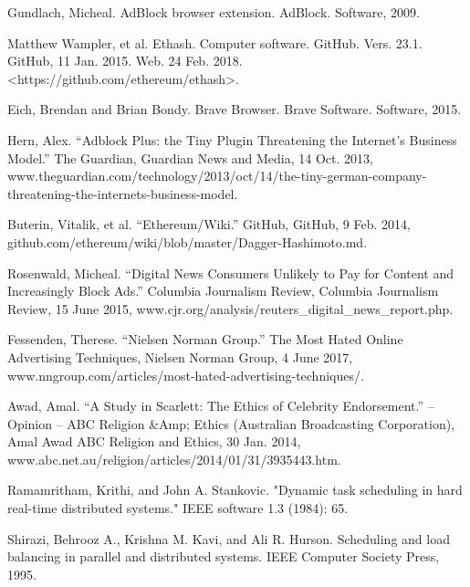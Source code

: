 \documentclass[runningheads]{llncs}
\begin{document}
\begin{thebibliography}{1}
 Gundlach, Micheal. AdBlock browser extension. AdBlock. Software, 2009.

Matthew Wampler, et al. Ethash. Computer software. GitHub. Vers. 23.1. GitHub, 11 Jan. 2015. Web. 24 Feb. 2018. <https://github.com/ethereum/ethash>. 

 Eich, Brendan and Brian Bondy. Brave Browser. Brave Software. Software, 2015.

 Hern, Alex. “Adblock Plus: the Tiny Plugin Threatening the Internet's Business Model.” The Guardian, Guardian News and Media, 14 Oct. 2013, www.theguardian.com/technology/2013/oct/14/the-tiny-german-company-threatening-the-internets-business-model.

 Buterin, Vitalik, et al. “Ethereum/Wiki.” GitHub, GitHub, 9 Feb. 2014, github.com/ethereum/wiki/blob/master/Dagger-Hashimoto.md. 

 Rosenwald, Micheal. “Digital News Consumers Unlikely to Pay for Content and Increasingly Block Ads.” Columbia Journalism Review, Columbia Journalism Review, 15 June 2015, www.cjr.org/analysis/reuters\_digital\_news\_report.php.

 Fessenden, Therese. “Nielsen Norman Group.” The Most Hated Online Advertising Techniques, Nielsen Norman Group, 4 June 2017, www.nngroup.com/articles/most-hated-advertising-techniques/.

 Awad, Amal. “A Study in Scarlett: The Ethics of Celebrity Endorsement.” – Opinion – ABC Religion \&Amp; Ethics (Australian Broadcasting Corporation), Amal Awad ABC Religion and Ethics, 30 Jan. 2014, www.abc.net.au/religion/articles/2014/01/31/3935443.htm.


Ramamritham, Krithi, and John A. Stankovic. "Dynamic task scheduling in hard real-time distributed systems." IEEE software 1.3 (1984): 65.

Shirazi, Behrooz A., Krishna M. Kavi, and Ali R. Hurson. Scheduling and load balancing in parallel and distributed systems. IEEE Computer Society Press, 1995.


\end{thebibliography}
\end{document}
